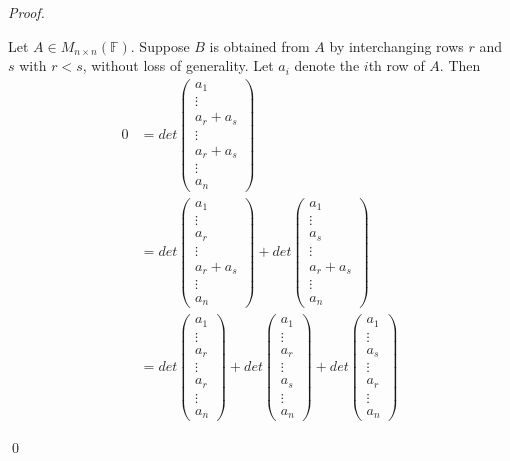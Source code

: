 \documentclass[12pt]{article}
\newenvironment{sol}
    {\emph{Proof.}
    }
    {
    \qed
    }
\begin{document}
\begin{sol} 
Let $A \in M_{n \times n}(\mathbb{F})$. Suppose $B$ is obtained from $A$ by interchanging rows $r$ and $s$ with $r < s$, without loss of generality. Let $a_i$ denote the $i$th row of $A$. Then \begin{align*}
    0 &= det\begin{pmatrix}
    a_1 \\ \vdots \\ a_r + a_s \\ \vdots \\ a_r + a_s \\ \vdots \\ a_n
    \end{pmatrix} \\ 
    &= det\begin{pmatrix}
    a_1 \\ \vdots \\ a_r \\ \vdots \\ a_r + a_s \\ \vdots \\ a_n
    \end{pmatrix} + det\begin{pmatrix}
    a_1 \\ \vdots \\ a_s \\ \vdots \\ a_r + a_s \\ \vdots \\ a_n
    \end{pmatrix} \\
    &= det\begin{pmatrix}
    a_1 \\ \vdots \\ a_r \\ \vdots \\ a_r \\ \vdots \\ a_n
    \end{pmatrix} + det\begin{pmatrix}
    a_1 \\ \vdots \\ a_r \\ \vdots \\ a_s \\ \vdots \\ a_n
    \end{pmatrix} + det\begin{pmatrix}
    a_1 \\ \vdots \\ a_s \\ \vdots \\ a_r \\ \vdots \\ a_n

\end{pmatrix}
\end{align*}
\end{sol}
\end{document}
